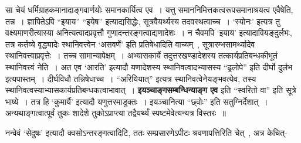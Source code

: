 सा चेयं धर्मिग्राहकमानादाङ्गवार्णयोः समानकार्यित्व एव~।
यत्तु समाननिमित्तकत्वरूपसमानाश्रयत्व एवैषेति, तन्न~।
ज्ञापितेऽपि ``इयाय'' ``इयेष''  इत्याद्यसिद्धेः, सूत्रवैयर्थ्यस्य तदवस्थत्वाच्च~।
 `स्योनः' इत्यत्र तु वक्ष्यमाणरीत्यास्या अनित्यत्वादप्रवृत्तौ गुणादन्तरङ्गत्वाद्यणादेशः~।
न चैवमपि `इयाय' इत्यादावियङ्‍दुर्लभः, तत्र कर्तव्ये वृद्ध्यादेः स्थानिवत्त्वेन `असवर्णे' इति प्रतिषेधादिति वाच्यम्~, सूत्रारम्भसामर्थ्यादेव स्थानिवत्त्वाप्रवृत्तेः~।
तच्च सामान्यापेक्षम्~।
अभ्यासकार्ये तदुत्तरखण्डादेशस्य तत्कार्यप्रतिबन्धकीभूतं स्थानिवत्त्वं नेति~।
अत एव `आरति' इत्यादौ यणादेशस्य स्थानिवत्वादभ्यासस्य ``ढ्रलोपे'' इति दीर्घो दुर्लभ इत्यपास्तम्~।
दीर्घविधौ तन्निषेधाच्च~।
 ``अरियियात्'' इत्यत्र स्थानिवत्वेनेयङ्भवत्येव, तस्य स्थानिवत्वस्याभ्यासकार्यप्रतिबन्धकत्वाभावात्~।
  {\bfseries  इयञ्चाङ्गसम्बन्धिन्याङ्ग एव} इति ``स्वरितो वा'' इति सूत्रे भाष्ये~।
तत्र हि `कुमार्यै' इत्यादौ यणुत्तरमाडुक्तः~।
इयञ्चानित्या  ``छ्वोः'' इति सतुग्निर्देशात्~।
अन्यथाङ्गत्वात्पूर्वं तुकः शादेशे तुकोऽप्राप्त्या तद्वैयर्थ्यं स्पष्टमेवेत्यन्यत्र विस्तरः~॥\par
नन्वेवं `सेदुषः' इत्यादौ क्वसोऽन्तरङ्गत्वादिटि, ततः सम्प्रसारणेऽपीटः श्रवणापत्तिरिति चेत्~, अत्र केचित्-

